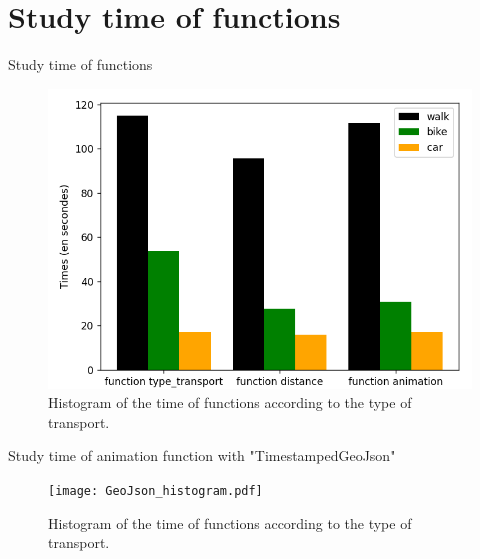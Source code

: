 \documentclass[11pt, compress]{beamer}
\theoremstyle{definition}
\begin{document}
\section[Times]{Study time of functions}
\begin{frame}{Study time of functions}
\begin{figure}[H]
    \centering
    \includegraphics[scale=.5]{histogram.png}
    \caption{Histogram of the time of functions according to the type of transport.}
    \label{fig:histogram}
\end{figure}
\end{frame}

\begin{frame}{Study time of animation function with "TimestampedGeoJson"}
\begin{figure}[H]
    \centering
    \texttt{[image: GeoJson\_histogram.pdf]}
    \caption{Histogram of the time of functions according to the type of transport.}
    \label{fig:histogram}
\end{figure}
\end{frame}
\end{document}
